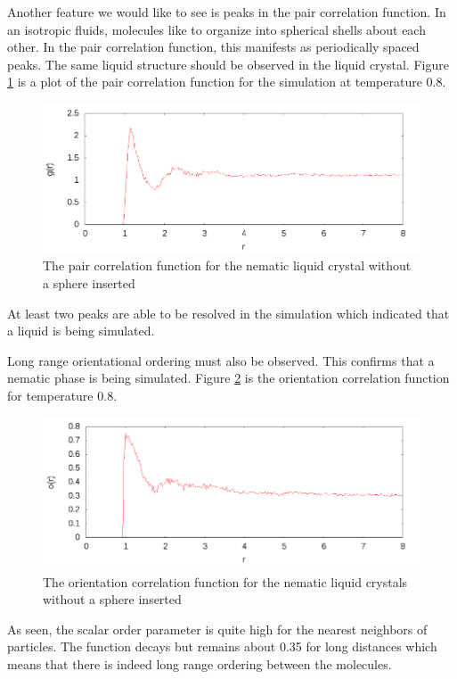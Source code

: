 \documentclass[preprint, aps]{revtex4-1}
\begin{document}
Another feature we would like to see is peaks in the pair correlation function.
In an isotropic fluids, molecules like to organize into spherical shells about
each other. In the pair correlation function, this manifests as periodically
spaced peaks. The same liquid structure should be observed in the liquid
crystal. Figure \ref{fig:pcf} is a plot of the pair correlation function
for the simulation at temperature 0.8.
	\begin{figure}[H]
		\includegraphics[width=\textwidth]{pcf.png}
		\caption{The pair correlation function for the nematic liquid crystal
		without a sphere inserted}
		\label{fig:pcf}
	\end{figure}
At least two peaks are able to be resolved in the simulation which indicated
that a liquid is being simulated.

Long range orientational ordering must also be observed. This confirms that a
nematic phase is being simulated. Figure \ref{fig:ocf} is the orientation
correlation function for temperature 0.8.
	\begin{figure}[H]
		\includegraphics[width=\textwidth]{ocf.png}
		\caption{The orientation correlation function for the nematic liquid
		crystals without a sphere inserted}
		\label{fig:ocf}
	\end{figure}
As seen, the scalar order parameter is quite high for the nearest neighbors of
particles. The function decays but remains about 0.35 for long distances which
means that there is indeed long range ordering between the molecules.
\end{document}
